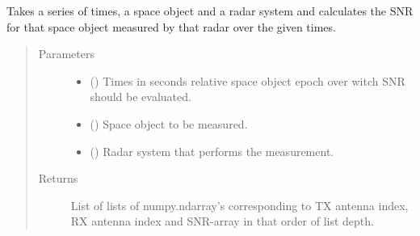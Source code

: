 \documentclass[letterpaper,10pt,english]{sphinxmanual}
\begin{document}
\begin{fulllineitems}
\label{\detokenize{modules/simulate_tracking:simulate_tracking.get_track_snr}}
Takes a series of times, a space object and a radar system and calculates the SNR for that space object measured by that radar over the given times.
\begin{quote}\begin{description}
\item[{Parameters}] \leavevmode\begin{itemize}
\item {} 
 () \textendash{} Times in seconds relative space object epoch over witch SNR should be evaluated.

\item {} 
 ({\hyperref[\detokenize{modules/space_object:space_object.SpaceObject}]{}}) \textendash{} Space object to be measured.

\item {} 
 ({\hyperref[\detokenize{modules/radar_config:radar_config.RadarSystem}]{}}) \textendash{} Radar system that performs the measurement.

\end{itemize}

\item[{Returns}] \leavevmode
List of lists of numpy.ndarray’s corresponding to TX antenna index, RX antenna index and SNR-array in that order of list depth.

\end{description}\end{quote}

\end{fulllineitems}

\end{document}
